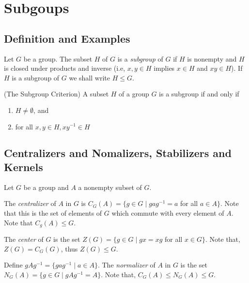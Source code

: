 \documentclass[../main]{subfiles}
\begin{document}
 
 \section{Subgoups}
 
 \subsection{Definition and Examples}
 
 
 \begin{dfn}
  Let $G$ be a group. The subset $H$ of $G$ is a \textit{subgroup} of $G$ if $H$ is nonempty and $H$ is closed under products and inverse (i.e, $x,y\in H$ implies $x\in H$ and $xy\in H$). If $H$ is a subgroup of $G$ we shall write $H\leq G$.
 \end{dfn}

 
 \begin{prop}
  (The Subgroup Criterion) A subset $H$ of a group $G$ is a subgroup if and only if 
  \begin{enumerate}
   \item $H\neq \emptyset$, and 
   \item for all $x,y \in H, xy^{-1}\in H$
  \end{enumerate}
 \end{prop}
 
 
 \subsection{Centralizers and Nomalizers, Stabilizers and Kernels}
 
 
 Let $G$ be a group and $A$ a nonempty subset of $G$.
 
 
 \begin{dfn}
  The \textit{centralizer} of $A$ in $G$ is $C_G(A)=\{g\in G \mid gag^{-1}=a $ for all $a\in A\}$. Note that this is the set of elements of $G$ which commute with every element of $A$. Note that $C_g(A) \leq G$.
 \end{dfn}
 
 
 \begin{dfn}
  The \textit{center} of $G$ is the set $Z(G)=\{g\in G\mid gx=xg$ for all $x\in G\}$. Note that, $Z(G)=C_G(G)$, thus $Z(G)\leq G$.
 \end{dfn}


 \begin{dfn}
  Define $gAg^{-1}=\{gag^{-1} \mid a\in A\}$. The \textit{normalizer} of $A$ in $G$ is the set $N_G(A)=\{g\in G \mid gAg^{-1}=A\}$. Note that, $C_G(A)\leq N_G(A)\leq G$.
 \end{dfn}
\end{document}
